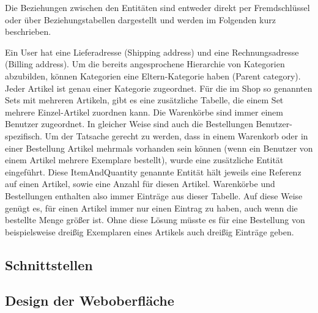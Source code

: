 Die Beziehungen zwischen den Entitäten sind entweder direkt per Fremdschlüssel oder über Beziehungstabellen dargestellt und werden im Folgenden kurz beschrieben.

Ein User hat eine Lieferadresse (Shipping address) und eine Rechnungsadresse (Billing address).
Um die bereits angesprochene Hierarchie von Kategorien abzubilden, können Kategorien eine Eltern-Kategorie haben (Parent category).
Jeder Artikel ist genau einer Kategorie zugeordnet. Für die im Shop so genannten Sets mit mehreren Artikeln, gibt es eine zusätzliche Tabelle, die einem Set mehrere Einzel-Artikel zuordnen kann.
Die Warenkörbe sind immer einem Benutzer zugeordnet. In gleicher Weise sind auch die Bestellungen Benutzer-spezifisch.
Um der Tatsache gerecht zu werden, dass in einem Warenkorb oder in einer Bestellung Artikel mehrmals vorhanden sein können (wenn ein Benutzer von einem Artikel mehrere Exemplare bestellt), wurde eine zusätzliche Entität eingeführt.
Diese ItemAndQuantity genannte Entität hält jeweils eine Referenz auf einen Artikel, sowie eine Anzahl für diesen Artikel.
Warenkörbe und Bestellungen enthalten also immer Einträge aus dieser Tabelle.
Auf diese Weise genügt es, für einen Artikel immer nur einen Eintrag zu haben, auch wenn die bestellte Menge größer ist.
Ohne diese Lösung müsste es für eine Bestellung von beispielsweise dreißig Exemplaren eines Artikels auch dreißig Einträge geben.

\subsection{Schnittstellen}

\subsection{Design der Weboberfläche}
